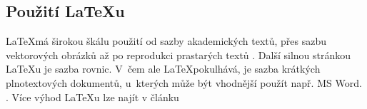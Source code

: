 \documentclass[11pt, a4paper]{article}
\begin{document}
\subsection{Použití \LaTeX u}
\LaTeX má širokou škálu použití od sazby akademických textů, přes sazbu vektorových obrázků \cite{SedaPavelVGIL} až po reprodukci prastarých textů \cite{ancientText}. Další silnou stránkou \LaTeX u je sazba rovnic. V~čem ale \LaTeX pokulhává, je sazba krátkých plnotextových dokumentů, u~kterých může být vhodnější použít např. MS Word. \cite{abstract}. Více výhod \LaTeX u lze najít v článku \cite{programujteClanek}

\newpage

\end{document}

